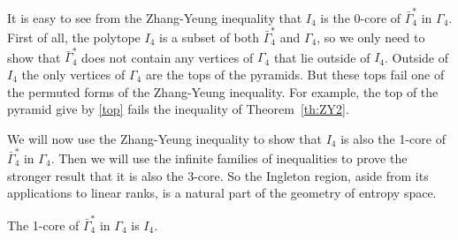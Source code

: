 \documentclass[10pt,journal]{IEEEtran}
\begin{document}
It is easy to see from the Zhang-Yeung inequality that $I_4$ is the 0-core of
$\bar\Gamma^*_4$ in $\Gamma_4$.  First of all,
the polytope $I_4$ is a subset of both $\bar\Gamma^*_4$ and $\Gamma_4$, so we only need to show that
$\bar\Gamma^*_4$ does not contain any vertices of $\Gamma_4$ that lie outside of $I_4$.
Outside of $I_4$ the only vertices
of $\Gamma_4$ are the tops of the pyramids.  But these tops fail
one of the permuted forms of the Zhang-Yeung inequality.  For example,
the top of the pyramid give by \eqref{top} fails the inequality of Theorem~\ref{th:ZY2}.

We will now use the Zhang-Yeung inequality to show that  $I_4$ is also the 1-core of $\bar\Gamma^*_4$ in $\Gamma_4$.
Then we will use the infinite families of inequalities to prove the stronger result
that it is also the 3-core.
So the Ingleton region, aside from its applications to linear ranks, is a natural part of the geometry of entropy space.

\begin{theorem}
The 1-core of $\bar\Gamma^*_4$ in $\Gamma_4$ is $I_4$.
\end{theorem}
\end{document}
